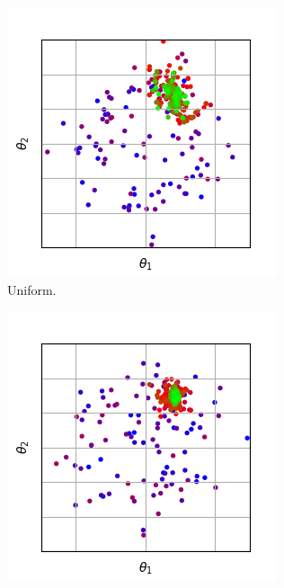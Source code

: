 \documentclass{llncs}
\begin{document}
\begin{figure}[t]
\begin{subfigure}[t]{0.24\textwidth}
        \includegraphics[width=\textwidth]{figures/recombination/simple_normal-100-10_uniform_0-1.png}
        \caption{Uniform.}
        \label{subfig:recomb_uniform_01}
    \end{subfigure}
    \begin{subfigure}[t]{0.24\textwidth}
        \centering
        \captionsetup{width=.9\textwidth}
        \includegraphics[width=\textwidth]{figures/recombination/simple_normal-100-10_whole_0-1.png}

\end{subfigure}
\end{figure}
\end{document}
